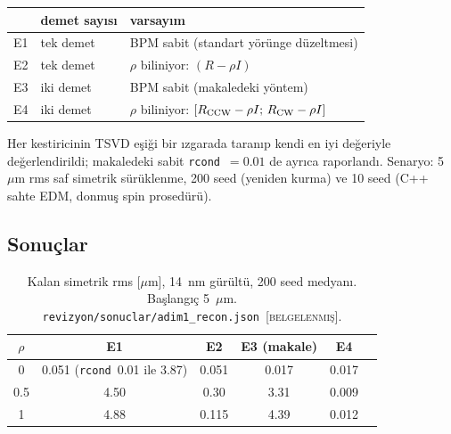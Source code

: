 \documentclass[11pt,a4paper]{article}
\newcommand{\kod}[1]{{\XeTeXinterchartokenstate=0\texttt{#1}}}
\newcommand{\BEL}{\textsc{[belgelenmiş]}}
\begin{document}
\begin{center}\small
\begin{tabular}{lll}
\toprule
& demet sayısı & varsayım \\
\midrule
E1 & tek demet & BPM sabit (standart yörünge düzeltmesi) \\
E2 & tek demet & $\rho$ biliniyor: $(R-\rho I)$ \\
E3 & iki demet & BPM sabit (makaledeki yöntem) \\
E4 & iki demet & $\rho$ biliniyor: $[R_{\rm CCW}-\rho I;\,R_{\rm CW}-\rho I]$ \\
\bottomrule
\end{tabular}
\end{center}

Her kestiricinin TSVD eşiği bir ızgarada taranıp kendi en iyi değeriyle değerlendirildi; makaledeki sabit
\kod{rcond}~$=0.01$ de ayrıca raporlandı. Senaryo: 5~$\mu$m rms saf simetrik sürüklenme, 200 seed
(yeniden kurma) ve 10 seed (C++ sahte EDM, donmuş spin prosedürü).

\subsection{Sonuçlar}

\begin{table}[H]\centering\small
\caption{Kalan simetrik rms [$\mu$m], 14~nm gürültü, 200 seed medyanı. Başlangıç 5~$\mu$m.
\kod{revizyon/sonuclar/adim1\_recon.json}~\BEL.}
\begin{tabular}{cccccc}
\toprule
$\rho$ & E1 & E2 & E3 (makale) & E4 \\
\midrule
0   & 0.051 (\kod{rcond}~0.01 ile 3.87) & 0.051 & 0.017 & 0.017 \\
0.5 & 4.50 & 0.30 & 3.31 & 0.009 \\
1   & 4.88 & 0.115 & 4.39 & 0.012 \\
\bottomrule
\end{tabular}
\end{table}
\end{document}
